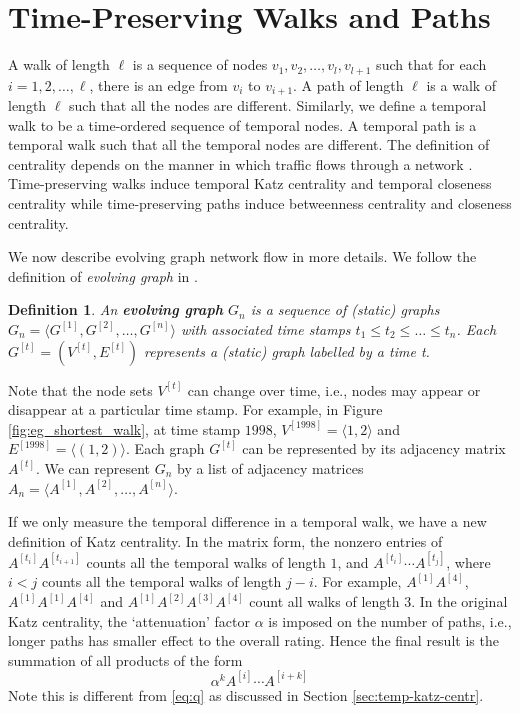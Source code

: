 \documentclass[12pt]{article}
\newtheorem{definition}{Definition}
\theoremstyle{definition}
\begin{document}
\section{Time-Preserving Walks and Paths}
\label{sec:time-pres-paths}

A walk of length $\ell$ is a sequence of nodes $v_1, v_2, \ldots, v_l, v_{l+1}$ such that for
each $i = 1, 2, \ldots, \ell$, there is an edge from $v_i$ to $v_{i+1}$. A path of length $\ell$ is a walk of length $\ell$
such that all the nodes are different.
Similarly, we define a temporal walk to be a time-ordered sequence of temporal nodes. A temporal path is a temporal walk such that all the temporal nodes are different.
The definition of centrality depends on the manner in which traffic flows through a network \cite{borgatti05}.
Time-preserving walks induce temporal Katz centrality and temporal closeness centrality while time-preserving paths induce betweenness centrality and closeness centrality.


We now describe evolving graph network flow in more details. We follow the definition of
\emph{evolving graph} in \cite{chen16}.

\begin{definition}
  An \textbf{evolving graph} $G_n$ is a sequence of (static) graphs
$G_n = \langle G^{[1]}, G^{[2]},  \ldots ,G^{[n]} \rangle$ with associated time stamps
$t_1 \leq t_2 \leq \ldots \leq t_n$.
Each $G^{[t]} = (V^{[t]}, E^{[t]})$ represents a (static) graph labelled by a time t.
\end{definition}

Note that the node sets $V^{[t]}$ can change over time, i.e., nodes may appear or disappear at a particular time stamp.
For example, in Figure \ref{fig:eg_shortest_walk}, at time stamp $1998$, $V^{[1998]} = \langle 1, 2 \rangle$ and $E^{[1998]} = \langle (1,2) \rangle$. Each graph $G^{[t]}$ can be represented by its adjacency matrix $A^{[t]}$.
We can represent $G_n$ by a list of adjacency matrices $A_n = \langle A^{[1]}, A^{[2]}, \ldots, A^{[n]} \rangle$.

If we only measure the temporal difference in a temporal walk, we have a new definition of Katz centrality.
In the matrix form, the nonzero entries of $A^{[t_i]} A^{[t_{i+1}]}$ counts all the temporal walks of length $1$, and
$A^{[t_i]}\cdots A^{[t_j]}$, where $i < j$ counts all the temporal walks of length $j -i$.
For example, $A^{[1]}A^{[4]}$, $A^{[1]}A^{[1]}A^{[4]}$ and $A^{[1]}A^{[2]}A^{[3]}A^{[4]}$ count all walks of length 3.
In the original Katz centrality, the `attenuation' factor $\alpha$ is imposed on the
number of paths, i.e., longer paths has smaller effect to the overall rating.
Hence the final result is the summation of all products of the form
\[
\alpha^k A^{[i]} \cdots A^{[i+k]}
\]
Note this is different from \eqref{eq:q} as discussed in Section \ref{sec:temp-katz-centr}.
\end{document}
